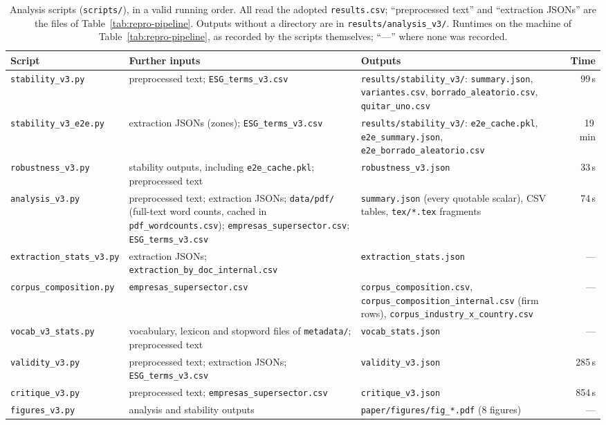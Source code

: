 \begin{table}[htbp]
\centering
\footnotesize
\caption{Analysis scripts (\nolinkurl{scripts/}), in a valid running order.
All read the adopted \texttt{results.csv}; ``preprocessed text'' and
``extraction JSONs'' are the files of Table~\ref{tab:repro-pipeline}. Outputs
without a directory are in \nolinkurl{results/analysis_v3/}. Runtimes on the
machine of Table~\ref{tab:repro-pipeline}, as recorded by the scripts
themselves; ``---'' where none was recorded.}
\label{tab:repro-analysis}
\setlength{\tabcolsep}{4pt}
\begin{tabular}{@{}>{\raggedright\arraybackslash}p{3.0cm}>{\raggedright\arraybackslash}p{5.6cm}>{\raggedright\arraybackslash}p{5.3cm}r@{}}
\toprule
Script & Further inputs & Outputs & Time \\
\midrule
\nolinkurl{stability_v3.py} & preprocessed text; \nolinkurl{ESG_terms_v3.csv} & \nolinkurl{results/stability_v3/}: \nolinkurl{summary.json}, \nolinkurl{variantes.csv}, \nolinkurl{borrado_aleatorio.csv}, \nolinkurl{quitar_uno.csv} & 99\,s \\
\nolinkurl{stability_v3_e2e.py} & extraction JSONs (zones); \nolinkurl{ESG_terms_v3.csv} & \nolinkurl{results/stability_v3/}: \nolinkurl{e2e_cache.pkl}, \nolinkurl{e2e_summary.json}, \nolinkurl{e2e_borrado_aleatorio.csv} & 19\,min \\
\nolinkurl{robustness_v3.py} & stability outputs, including \nolinkurl{e2e_cache.pkl}; preprocessed text & \nolinkurl{robustness_v3.json} & 33\,s \\
\nolinkurl{analysis_v3.py} & preprocessed text; extraction JSONs; \nolinkurl{data/pdf/} (full-text word counts, cached in \nolinkurl{pdf_wordcounts.csv}); \nolinkurl{empresas_supersector.csv}; \nolinkurl{ESG_terms_v3.csv} & \nolinkurl{summary.json} (every quotable scalar), CSV tables, \nolinkurl{tex/*.tex} fragments & 74\,s \\
\nolinkurl{extraction_stats_v3.py} & extraction JSONs; \nolinkurl{extraction_by_doc_internal.csv} & \nolinkurl{extraction_stats.json} & --- \\
\nolinkurl{corpus_composition.py} & \nolinkurl{empresas_supersector.csv} & \nolinkurl{corpus_composition.csv}, \nolinkurl{corpus_composition_internal.csv} (firm rows), \nolinkurl{corpus_industry_x_country.csv} & --- \\
\nolinkurl{vocab_v3_stats.py} & vocabulary, lexicon and stopword files of \nolinkurl{metadata/}; preprocessed text & \nolinkurl{vocab_stats.json} & --- \\
\nolinkurl{validity_v3.py} & preprocessed text; extraction JSONs; \nolinkurl{ESG_terms_v3.csv} & \nolinkurl{validity_v3.json} & 285\,s \\
\nolinkurl{critique_v3.py} & preprocessed text; \nolinkurl{empresas_supersector.csv} & \nolinkurl{critique_v3.json} & 854\,s \\
\nolinkurl{figures_v3.py} & analysis and stability outputs & \nolinkurl{paper/figures/fig_*.pdf} (8 figures) & --- \\
\bottomrule
\end{tabular}
\end{table}

